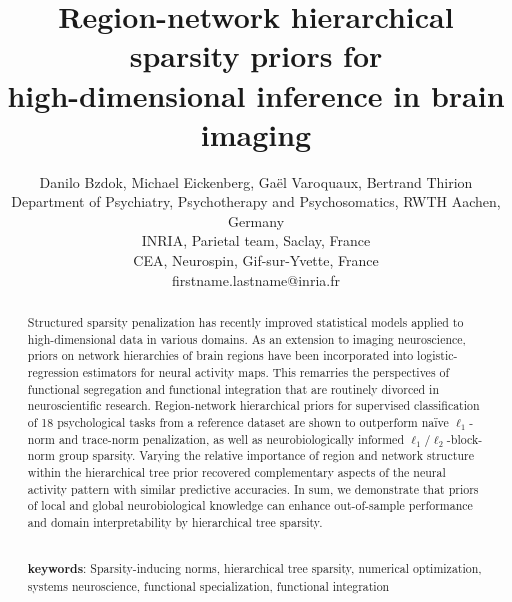 \documentclass{article} %
\title{Region-network hierarchical sparsity priors for\\
high-dimensional inference in brain imaging}
\begin{document}
\author{Danilo Bzdok, Michael Eickenberg,
  Ga\"el Varoquaux, Bertrand Thirion\\
  Department of Psychiatry, Psychotherapy and Psychosomatics, RWTH Aachen, Germany\\
  INRIA, Parietal team, Saclay, France\\
  CEA, Neurospin, Gif-sur-Yvette, France\\
  firstname.lastname@inria.fr}

\maketitle

\begin{abstract}
Structured sparsity penalization has recently improved
statistical models applied to high-dimensional data in various domains.
As an extension to imaging neuroscience,
priors on network hierarchies of brain regions have been incorporated into
logistic-regression estimators for neural activity maps.
This remarries the perspectives of
functional segregation and functional integration
that are routinely divorced in neuroscientific research.
%
Region-network hierarchical priors for supervised classification
of 18 psychological tasks
from a reference dataset are
shown to outperform na\"ive $\ell_1$-norm and
trace-norm penalization, as well as neurobiologically
informed $\ell_1/\ell_2$-block-norm group sparsity.
Varying the relative importance of
region and network structure within the hierarchical tree prior
recovered complementary aspects of the neural activity pattern
with similar predictive accuracies.
%
In sum,
we demonstrate that priors of local and global neurobiological knowledge can enhance
out-of-sample performance and domain interpretability
by hierarchical tree sparsity.



\textbf{\\keywords}:
Sparsity-inducing norms, hierarchical tree sparsity,
numerical optimization,
systems neuroscience,
functional specialization, functional integration

\end{abstract}
\end{document}
